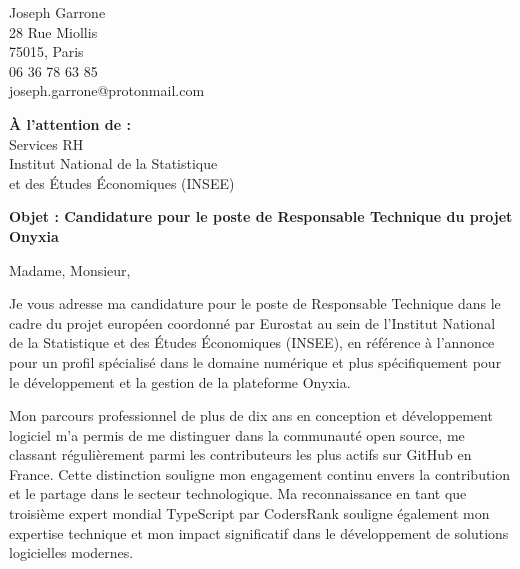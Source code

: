 \documentclass[11pt,a4paper]{article}
\begin{document}
\begin{flushleft}
Joseph Garrone\\
28 Rue Miollis\\
75015, Paris\\
06 36 78 63 85\\
joseph.garrone@protonmail.com\\
\end{flushleft}

\vspace{2em}

\begin{flushright}
\textbf{À l'attention de :}\\
Services RH\\
Institut National de la Statistique\\
et des Études Économiques (INSEE)\\
\end{flushright}

\vspace{2em}

\begin{center}
\textbf{Objet : Candidature pour le poste de Responsable Technique du projet Onyxia}
\end{center}

\vspace{2em}

Madame, Monsieur,

\vspace{1em}

Je vous adresse ma candidature pour le poste de Responsable Technique dans le cadre du projet européen coordonné par Eurostat au sein de l'Institut National de la Statistique et des Études Économiques (INSEE), en référence à l'annonce pour un profil spécialisé dans le domaine numérique et plus spécifiquement pour le développement et la gestion de la plateforme Onyxia.

\vspace{1em}

Mon parcours professionnel de plus de dix ans en conception et développement logiciel m'a permis de me distinguer dans la communauté open source, me classant régulièrement parmi les contributeurs les plus actifs sur GitHub en France. Cette distinction souligne mon engagement continu envers la contribution et le partage dans le secteur technologique. Ma reconnaissance en tant que troisième expert mondial TypeScript par CodersRank souligne également mon expertise technique et mon impact significatif dans le développement de solutions logicielles modernes.
\end{document}
